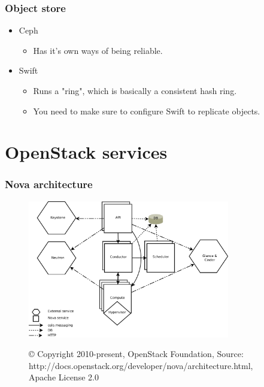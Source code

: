 \documentclass[aspectratio=169]{beamer}
\begin{document}
\begin{frame}
    \frametitle{Object store}
    \begin{center}
        \begin{itemize}
            \item Ceph
            \begin{itemize}
                \item Has it's own ways of being reliable.
            \end{itemize}
            \pause
            \item Swift
            \begin{itemize}
                \item Runs a "ring", which is basically a consistent hash ring.
                \item You need to make sure to configure Swift to replicate objects.
            \end{itemize}
        \end{itemize}
    \end{center}
\end{frame}

\section{OpenStack services}

\begin{frame}
    \frametitle{Nova architecture}
    \begin{figure}
        \includegraphics[height=6cm]{images/nova-architecture.png}

        \tiny{© Copyright 2010-present, OpenStack Foundation, Source: http://docs.openstack.org/developer/nova/architecture.html, Apache License 2.0}
    \end{figure}
\end{frame}
\end{document}
